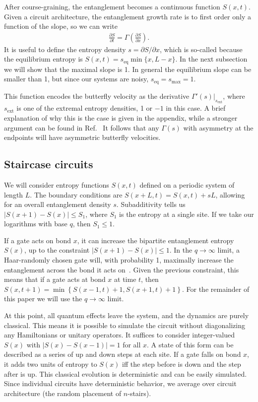 \documentclass[aps,prx,reprint,superscriptaddress, longbibliography]{revtex4-1}
\newcommand{\charlie}[1]{{\color{Magenta}{{#1}}}}
\begin{document}
After course-graining, the entanglement becomes a continuous function $S(x,t)$. Given a circuit architecture, the entanglement growth rate is to first order only a function of the slope, so we can write \cite{Jonay}
\begin{align}
\frac{\partial S}{\partial t} = \Gamma\left(\frac{\partial S}{\partial x}\right).
\end{align}
It is useful to define the entropy density $s = \partial S / \partial x$, which is so-called because the equilibrium entropy is $S(x, t) = s_\text{eq} \min\{x, L - x\}$.  In the next subsection we will show that the maximal slope is 1. In general the equilibrium slope can be smaller than 1, but since our systems are noisy, $s_\text{eq} = s_\text{max} = 1$.

This function encodes the butterfly velocity as the derivative $\Gamma'(s)|_{s_\text{ext}}$, where $s_\text{ext}$ is one of the extremal entropy densities, 1 or $-1$ in this case. A brief explanation of why this is the case is given in the appendix, while a stronger argument can be found in Ref.~\cite{Jonay}
It follows that any $\Gamma(s)$ with asymmetry at the endpoints will have asymmetric butterfly velocities.

\subsection{Staircase circuits}

We will consider entropy functions $S(x,t)$ defined on a periodic system of length $L$. The boundary conditions are $S(x+L,t) = S(x,t)+sL$, allowing for an overall entanglement density $s$.
Subadditivity tells us ${|S(x + 1)-S(x)|} \le S_1$, where $S_1$ is the entropy at a single site. If we take our logarithms with base $q$, then $S_1 \le 1$.

If a gate acts on bond $x$, it can increase the bipartite entanglement entropy $S(x)$, up to the constraint $|S(x + 1) - S(x)| \le 1$. In the $q\to\infty$ limit, a Haar-randomly chosen gate will, with probability 1, maximally increase the entanglement across the bond it acts on~\cite{nahum2017quantum}. Given the previous constraint, this means that if a gate acts at bond $x$ at time $t$, then $S(x, t+1) = \min\left\lbrace S(x-1,t)+1, S(x+1,t)+1\right\rbrace$. \charlie{Should we explain why?} For the remainder of this paper we will use the $q\to\infty$ limit.

At this point, all quantum effects leave the system, and the dynamics are purely classical. This means it is possible to simulate the circuit without diagonalizing any Hamiltonians or unitary operators. It suffices to consider integer-valued $S(x)$ with $|S(x)-S(x-1)|=1$ for all $x$. A state of this form can be described as a series of up and down steps at each site. If a gate falls on bond $x$, it adds two units of entropy to $S(x)$ iff the step before is down and the step after is up. This classical evolution is deterministic and can be easily simulated.
Since individual circuits have deterministic behavior, we average over circuit architecture (the random placement of $n$-stairs).
\end{document}

